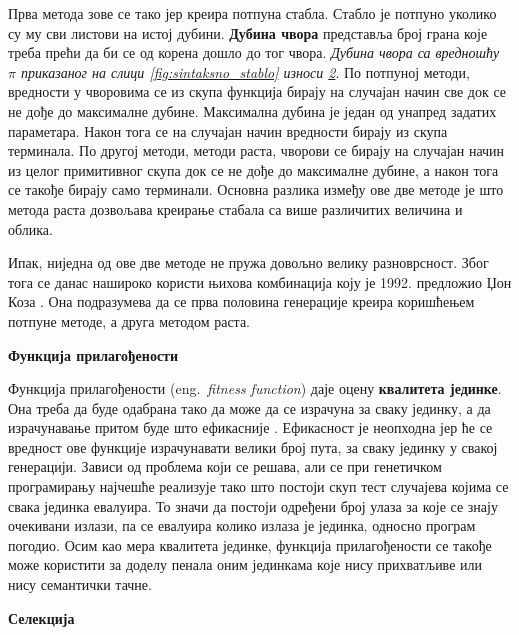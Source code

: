 \documentclass[a4paper]{article}
\begin{document}
Прва метода зове се тако јер креира потпуна стабла. Стабло је потпуно уколико су му сви листови на истој дубини. \textbf{Дубина чвора} представља број грана које треба прећи да би се од корена дошло до тог чвора. \emph{Дубина чвора са вредношћу $\pi$ приказаног на слици \ref{fig:sintaksno_stablo} износи \underline{2}}. По потпуној методи, вредности у чворовима се из скупа функција бирају на случајан начин све док се не дође до максималне дубине. Максимална дубина је један од унапред задатих параметара. Након тога се на случајан начин вредности бирају из скупа терминала. По другој методи, методи раста, чворови се бирају на случајан начин из целог примитивног скупа док се не дође до максималне дубине, а након тога се такође бирају само терминали. Основна разлика између ове две методе је што метода раста дозвољава креирање стабала са више различитих величина и облика. \newline

Ипак, ниједна од ове две методе не пружа довољно велику разноврсност. Због тога се данас нашироко користи њихова комбинација коју је 1992. предложио Џон Коза \cite{koza}. Она подразумева да се прва половина генерације креира коришћењем потпуне методе, а друга методом раста.

\noindent
\textbf{\large Функција прилагођености}\newline 

Функција прилагођености (eng.~{\em fitness function}) даје оцену \textbf{квалитета јединке}. Она треба да буде одабрана тако да може да се израчуна за сваку јединку, а да израчунавање притом буде што ефикасније \cite{vi}. Ефикасност је неопходна јер ће се вредност ове функције израчунавати велики број пута, за сваку јединку у свакој генерацији. Зависи од проблема који се решава, али се при генетичком програмирању најчешће реализује тако што постоји скуп тест случајева којима се свака јединка евалуира. То значи да постоји одређени број улаза за које се знају очекивани излази, па се евалуира колико излаза је јединка, односно програм погодио.
Осим као мера квалитета јединке, функција прилагођености се такође може користити за доделу пенала оним јединкама које нису прихватљиве или нису семантички тачне.\newline


\noindent
\textbf{\large Селекција}\newline
\end{document}

